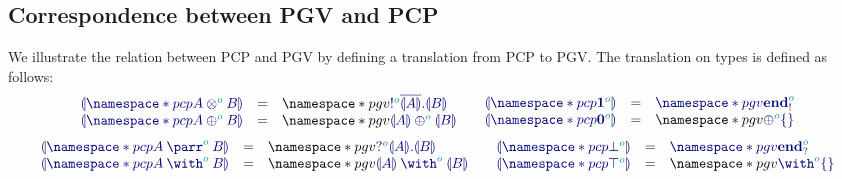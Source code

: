 \subsection{Correspondence between PGV and PCP}
\begingroup
We illustrate the relation between PCP and PGV by defining a translation from PCP to PGV. The translation on types is defined as follows:
\[
  \begin{array}{lcl}
    \ty{\cpgvT{\pcp{\tytens[\cs{o}]{A}{B}}}}
    & = & \pgv{\ty{\tysend[\cs{o}]{\co{\cpgvT{A}}}{\cpgvT{B}}}}
    \\
    \ty{\cpgvT{\pcp{\typlus[\cs{o}]{A}{B}}}}
    & = & \pgv{\ty{\tyselect[\cs{o}]{\cpgvT{A}}{\cpgvT{B}}}}
  \end{array}
  \hfill\quad\hfill%
  \begin{array}{lcl}
    \ty{\cpgvT{\pcp{\tyone[\cs{o}]}}}
    & = & \ty{\pgv{\tyends[\cs{o}]}}
    \\
    \ty{\cpgvT{\pcp{\tynil[\cs{o}]}}}
    & = & \pgv{\ty{\tyselectemp[\cs{o}]}}
  \end{array}
\]%
\[%
  \begin{array}{lcl}
    \ty{\cpgvT{\pcp{\typarr[\cs{o}]{A}{B}}}}
    & = & \pgv{\ty{\tyrecv[\cs{o}]{\cpgvT{A}}{\cpgvT{B}}}}
    \\
    \ty{\cpgvT{\pcp{\tywith[\cs{o}]{A}{B}}}}
    & = & \pgv{\ty{\tyoffer[\cs{o}]{\cpgvT{A}}{\cpgvT{B}}}}
  \end{array}
  \hfill\quad\hfill%
  \begin{array}{lcl}
    \ty{\cpgvT{\pcp{\tybot[\cs{o}]}}}
    & = & \ty{\pgv{\tyendr[\cs{o}]}}
    \\
    \ty{\cpgvT{\pcp{\tytop[\cs{o}]}}}
    & = & \pgv{\ty{\tyofferemp[\cs{o}]}}
  \end{array}
\]

